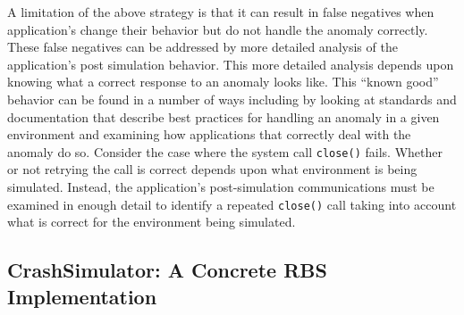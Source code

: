 A limitation of the above strategy
is that it can result in false negatives
when application's change their behavior
but do not handle the anomaly correctly.
These false negatives can be addressed
by more detailed analysis
of the application's post simulation behavior.
This more detailed analysis
depends upon knowing what a correct response
to an anomaly looks like.
This ``known good'' behavior can be found
in a number of ways
including by looking at standards and documentation
that describe best practices for handling an anomaly
in a given environment
and examining how applications that correctly
deal with the anomaly do so.
Consider the case where the system call {\tt close()} fails.
Whether or not retrying the call is correct
depends upon what environment is being simulated.
Instead, the application's post-simulation communications
must be examined in enough detail to identify a repeated {\tt close()}
call taking into account
what is correct for the environment being simulated.


\subsection{CrashSimulator: A Concrete RBS Implementation}
